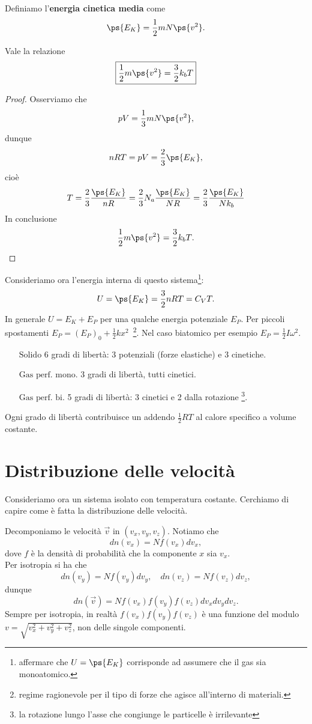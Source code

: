 \begin{definition}
Definiamo l'\textbf{energia cinetica media} come \[\ps{E_K}=\frac12mN\ps{v^2}.\]
\end{definition}
\begin{remark}
Vale la relazione
\[\boxed{\frac12m\ps{v^2}=\frac32 k_b T}\]
\end{remark}
\begin{proof}
Osserviamo che
\[pV=\frac13 mN\ps{v^2},\]
dunque
\[nRT=pV=\frac23\ps{E_K},\]
cio\`e
\[T=\frac 23\frac{\ps{E_K}}{nR}=\frac 23N_a\frac{\ps{E_K}}{NR}=\frac 23\frac{\ps{E_K}}{Nk_b}\]
In conclusione
\[{\frac12m\ps{v^2}=\frac32 k_b T}.\]
\end{proof}

\noindent
Consideriamo ora l'energia interna di questo sistema\footnote{affermare che $U=\ps{E_K}$ corrisponde ad assumere che il gas sia monoatomico.}:
\[U=\ps{E_K}=\frac32nRT=C_VT.\]
In generale $U=E_K+E_P$ per una qualche energia potenziale $E_P$. Per piccoli spostamenti $E_P=(E_P)_0+\frac12kx^2$\ \footnote{regime ragionevole per il tipo di forze che agisce all'interno di materiali.}. Nel caso biatomico per esempio $E_P=\frac12I\omega^2$.
\setlength{\leftmargini}{0cm}
\begin{itemize}
\item[$\boxed{\text{Solido}}$] 6 gradi di libert\`a: 3 potenziali (forze elastiche) e 3 cinetiche.
\item[$\boxed{\text{Gas perf. mono.}}$] 3 gradi di libert\`a, tutti cinetici.
\item[$\boxed{\text{Gas perf. bi.}}$] 5 gradi di libert\`a: 3 cinetici e 2 dalla rotazione \footnote{la rotazione lungo l'asse che congiunge le particelle \`e irrilevante}.
\end{itemize}
\setlength{\leftmargini}{0.5cm}


\begin{fact}
Ogni grado di libert\`a contribuisce un addendo $\frac12 RT$ al calore specifico a volume costante.
\end{fact}

\section{Distribuzione delle velocit\`a}
Consideriamo ora un sistema isolato con temperatura costante. Cerchiamo di capire come \`e fatta la distribuzione delle velocit\`a.

Decomponiamo le velocit\`a $\vec v$ in $(v_x,v_y,v_z)$. Notiamo che
\[dn(v_x)=Nf(v_x)dv_x,\]
dove $f$ \`e la densit\`a di probabilit\`a che la componente $x$ sia $v_x$.\\
Per isotropia si ha che
\[dn(v_y)=Nf(v_y)dv_y,\quad dn(v_z)=Nf(v_z)dv_z,\]
dunque
\[dn(\vec v)=N f(v_x)f(v_y)f(v_z)dv_xdv_ydv_z.\]
Sempre per isotropia, in realt\`a $f(v_x)f(v_y)f(v_z)$ \`e una funzione del modulo $v=\sqrt{v_x^2+v_y^2+v_z^2}$, non delle singole componenti.

